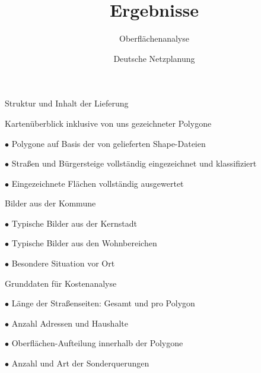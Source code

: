 \documentclass[11pt, dvipsnames,aspectratio=169]{beamer}
\author[DNP]{Deutsche Netzplanung}
\title[Ergebnisse \Ort]{\textbf{Ergebnisse} \\ \Ort}
\subtitle{Oberflächenanalyse}
\date{\Abgabedatum}
\begin{document}
	
{
	\maketitle
}

\begin{frame}{Struktur und Inhalt der Lieferung \Ort}
	\begin{bulletlist}{5pt}
		\item Kartenüberblick inklusive von uns gezeichneter Polygone
			\begin{bulletlist}{3pt}
				\item[$\bullet$] Polygone auf Basis der von \Kunde{} gelieferten Shape-Dateien
				\item[$\bullet$] Straßen und Bürgersteige vollständig eingezeichnet und klassifiziert
				\item[$\bullet$] Eingezeichnete Flächen vollständig ausgewertet
			\end{bulletlist}
		\item Bilder aus der Kommune
		\begin{bulletlist}{3pt}
			\item[$\bullet$] Typische Bilder aus der Kernstadt
			\item[$\bullet$] Typische Bilder aus den Wohnbereichen
			\item[$\bullet$] Besondere Situation vor Ort
		\end{bulletlist}
		\item Grunddaten für Kostenanalyse
		\begin{bulletlist}{3pt}
			\item[$\bullet$] Länge der Straßenseiten: Gesamt und pro Polygon
			\item[$\bullet$] Anzahl Adressen und Haushalte
			\item[$\bullet$] Oberflächen-Aufteilung innerhalb der Polygone
			\item[$\bullet$] Anzahl und Art der Sonderquerungen
		\end{bulletlist}
	\end{bulletlist}
\end{frame}
\end{document}
